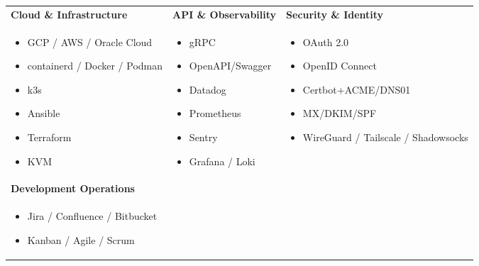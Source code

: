 \documentclass[a4paper,10pt]{article}
\begin{document}
\begin{tabular}{L{\skillcolwidth}|L{\skillcolwidth}|L{\skillcolwidth}}
  \textbf{Cloud \& Infrastructure} & 
  \textbf{API \& Observability} & 
  \textbf{Security \& Identity} \\
  \begin{itemize}[leftmargin=*]
    \item GCP / AWS / Oracle Cloud
    \item containerd / Docker / Podman
    \item k3s
    \item Ansible
    \item Terraform
    \item KVM
  \end{itemize} & 
  \begin{itemize}[leftmargin=*]
    \item gRPC
    \item OpenAPI/Swagger
    \item Datadog
    \item Prometheus
    \item Sentry
    \item Grafana / Loki
  \end{itemize} & 
  \begin{itemize}[leftmargin=*]
    \item OAuth 2.0
    \item OpenID Connect
    \item Certbot+ACME/DNS01
    \item MX/DKIM/SPF
    \item WireGuard / Tailscale / Shadowsocks
   \end{itemize} \\
  \hline
  
  \textbf{Development Operations} & & \\
  \begin{itemize}[leftmargin=*]
    \item Jira / Confluence / Bitbucket
    \item Kanban / Agile / Scrum
  \end{itemize} & & \\
  \end{tabular}
  
\end{document}
